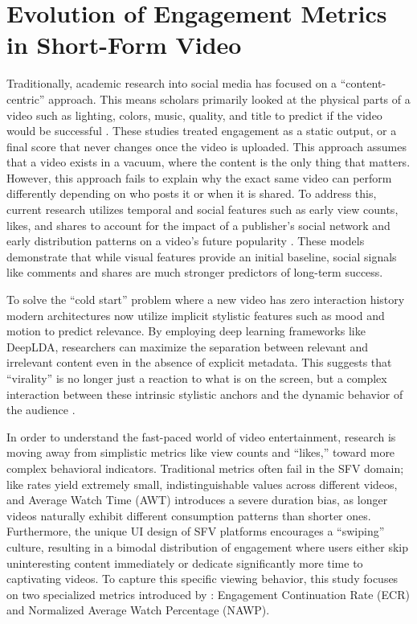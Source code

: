 \section{Evolution of Engagement Metrics in Short-Form Video}
Traditionally, academic research into social media has focused on a ``content-centric'' approach. This means scholars primarily looked at the physical parts of a video such as lighting, colors, music, quality, and title to predict if the video would be successful \cite{8549180}. These studies treated engagement as a static output, or a final score that never changes once the video is uploaded. This approach assumes that a video exists in a vacuum, where the content is the only thing that matters. However, this approach fails to explain why the exact same video can perform differently depending on who posts it or when it is shared. To address this, current research utilizes temporal and social features such as early view counts, likes, and shares to account for the impact of a publisher's social network and early distribution patterns on a video's future popularity \cite{trzcinski2017predicting}. These models demonstrate that while visual features provide an initial baseline, social signals like comments and shares are much stronger predictors of long-term success.

To solve the ``cold start'' problem where a new video has zero interaction history modern architectures now utilize implicit stylistic features such as mood and motion to predict relevance. By employing deep learning frameworks like DeepLDA, researchers can maximize the separation between relevant and irrelevant content even in the absence of explicit metadata. This suggests that ``virality'' is no longer just a reaction to what is on the screen, but a complex interaction between these intrinsic stylistic anchors and the dynamic behavior of the audience \cite{kumar2018icebreaker}.

In order to understand the fast-paced world of video entertainment, research is moving away from simplistic metrics like view counts and ``likes,'' toward more complex behavioral indicators. Traditional metrics often fail in the SFV domain; like rates yield extremely small, indistinguishable values across different videos, and Average Watch Time (AWT) introduces a severe duration bias, as longer videos naturally exhibit different consumption patterns than shorter ones. Furthermore, the unique UI design of SFV platforms encourages a ``swiping'' culture, resulting in a bimodal distribution of engagement where users either skip uninteresting content immediately or dedicate significantly more time to captivating videos. To capture this specific viewing behavior, this study focuses on two specialized metrics introduced by \citeauthor{li2024delving} \citeyear{li2024delving}: Engagement Continuation Rate (ECR) and Normalized Average Watch Percentage (NAWP).

